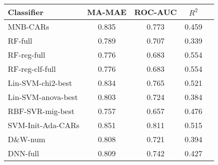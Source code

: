 \begin{table}[]
\centering
    \begin{tabular}{|l|c|c|c|c|}
        \hline
        \textsf{ Classifier } & \textsf{ MA-MAE } & \textsf{ ROC-AUC } & \textsf{ $R^2$ } & \\
        \hline
        \cellcolor{gray!15} \textsf{ MNB-CARs } & 0.835 & 0.773 & 0.459 & \\
        \cellcolor{gray!15} \textsf{ RF-full } & 0.789 & 0.707 & 0.339 & \\
       \cellcolor{gray!15} \textsf{ RF-reg-full } & 0.776 & 0.683 & \cellcolor{gray!15} 0.554 & \\
       \cellcolor{gray!15} \textsf{ RF-reg-clf-full } & 0.776 & 0.683 & \cellcolor{gray!15} 0.554 & \\
       \cellcolor{gray!15} \textsf{ Lin-SVM-chi2-best } & 0.834 & 0.765 & 0.521 & \\ 
       \cellcolor{gray!15} \textsf{ Lin-SVM-anova-best } & 0.803 & 0.724 & 0.384 & \\ 
       \cellcolor{gray!15} \textsf{ RBF-SVR-mig-best } & 0.757 & 0.657 & 0.476 & \\ 
       \cellcolor{gray!15} \textsf{ SVM-Init-Ada-CARs } & \cellcolor{gray!15} 0.851 & \cellcolor{gray!15} 0.811 & 0.515 & \\ 
       \cellcolor{gray!15} \textsf{ D\&W-num } & 0.808 & 0.721 & 0.394 & \\ 
   \cellcolor{gray!15} \textsf{ DNN-full } & 0.809 & 0.742 & 0.427 & \\ 
        \hline


\end{tabular}
\end{table}
